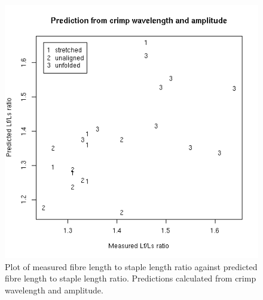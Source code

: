 %

\begin{figure}[!h]
  \centering
  \includegraphics[width=1.0\textwidth]{figpwarat.png}
  \caption{Plot of measured fibre length to staple length ratio against predicted fibre length to staple length ratio. Predictions calculated from crimp wavelength and amplitude.}
  \label{fig:pwarat}
\end{figure}

%

